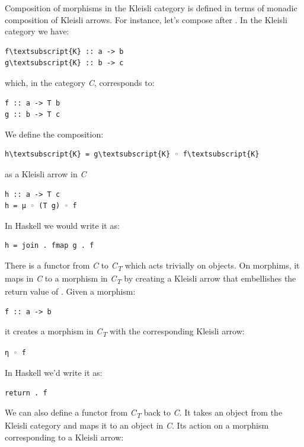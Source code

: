 Composition of morphisms in the Kleisli category is defined in terms of
monadic composition of Kleisli arrows. For instance, let's compose
 after . In the Kleisli category we have:

\begin{Verbatim}[commandchars=\\\{\}]
f\textsubscript{K} :: a -> b
g\textsubscript{K} :: b -> c
\end{Verbatim}
which, in the category \emph{C}, corresponds to:

\begin{verbatim}
f :: a -> T b
g :: b -> T c
\end{verbatim}
We define the composition:

\begin{Verbatim}[commandchars=\\\{\}]
h\textsubscript{K} = g\textsubscript{K} ◦ f\textsubscript{K}
\end{Verbatim}
as a Kleisli arrow in \emph{C}

\begin{verbatim}
h :: a -> T c
h = μ ◦ (T g) ◦ f
\end{verbatim}
In Haskell we would write it as:

\begin{verbatim}
h = join . fmap g . f
\end{verbatim}
There is a functor  from \emph{C} to \emph{C\textsubscript{T}}
which acts trivially on objects. On morphims, it maps  in
\emph{C} to a morphism in \emph{C\textsubscript{T}} by creating a
Kleisli arrow that embellishes the return value of . Given a
morphism:

\begin{verbatim}
f :: a -> b
\end{verbatim}
it creates a morphism in \emph{C\textsubscript{T}} with the
corresponding Kleisli arrow:

\begin{verbatim}
η ◦ f
\end{verbatim}
In Haskell we'd write it as:

\begin{verbatim}
return . f
\end{verbatim}
We can also define a functor  from \emph{C\textsubscript{T}}
back to \emph{C}. It takes an object  from the Kleisli
category and maps it to an object  in \emph{C}. Its action
on a morphism  corresponding to a Kleisli arrow:

